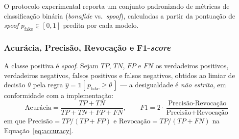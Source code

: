 \documentclass[12pt,a4paper]{article}
\begin{document}
O protocolo experimental reporta um conjunto padronizado de métricas de
classificação binária (\textit{bonafide} vs.\ \textit{spoof}), calculadas a
partir da pontuação de \textit{spoof} $p_{\mathrm{fake}} \in [0,1]$ predita por cada
modelo.

\subsubsection*{Acurácia, Precisão, Revocação e F1-\textit{score}}

A classe positiva é \textit{spoof}. Sejam $TP$, $TN$, $FP$ e $FN$ os
verdadeiros positivos, verdadeiros negativos, falsos positivos e falsos
negativos, obtidos ao limiar de decisão $\theta$ pela regra
$\hat{y} = \mathbb{1}[\,p_{\mathrm{fake}} \geq \theta\,]$ --- a desigualdade é
\emph{não estrita}, em conformidade com a implementação:
\begin{equation}
	\label{eq:accuracy}
	\text{Acurácia} = \frac{TP + TN}{TP + TN + FP + FN}, \qquad
	F1 = 2 \cdot \frac{\text{Precisão} \cdot \text{Revocação}}{\text{Precisão} + \text{Revocação}}
\end{equation}
\noindent
em que $\text{Precisão} = TP/(TP+FP)$ e $\text{Revocação} = TP/(TP+FN)$ na
Equação~\ref{eq:accuracy}.
\end{document}
